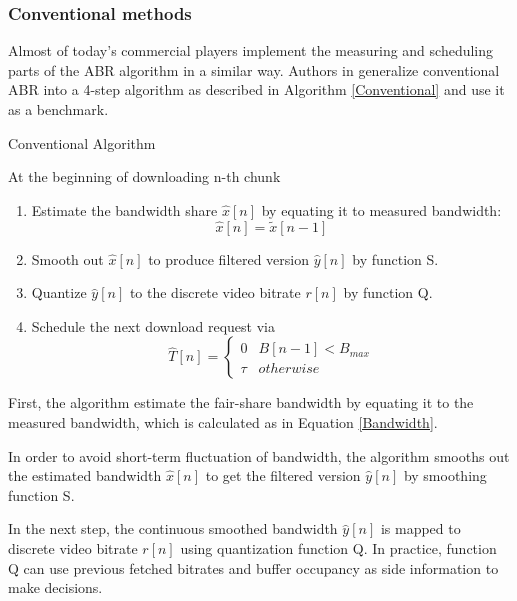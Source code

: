 \documentclass[journal]{IEEEtran}
\begin{document}
\subsubsection{Conventional methods}
Almost of today's commercial players \cite{Commercial 1} \cite{Commercial 2} \cite{Commercial 3} implement the measuring and scheduling parts of the ABR algorithm in a similar way. Authors in \cite{PANDA} generalize conventional ABR into a 4-step algorithm as described in Algorithm \ref{Conventional} and use it as a benchmark.
\begin{algorithm}
	
	\SetAlgoLined
	\caption{Conventional Algorithm}
	\label{Conventional}
		
	At the beginning of downloading n-th chunk\
    \begin{enumerate}
    	\item Estimate the bandwidth share $\hat{x}[n]$ by equating it to measured bandwidth:\
    	\begin{equation}
\hat{x}[n]=\tilde{x}[n-1]
    	\end{equation}
    	\item
    	Smooth out $\hat{x}[n]$ to produce filtered version $\hat{y}[n]$ by function S.
    	\item Quantize  $\hat{y}[n]$ to the discrete video bitrate $r[n]$ by function Q.
    	\item Schedule the next download request via
    	\begin{equation}
    	\hat{T}[n]=\begin{cases}
0 & B[n-1]<B_{max}\\
\tau & otherwise
\end{cases}
    	\end{equation}
    \end{enumerate}

		
\end{algorithm}
\par
First, the algorithm estimate the fair-share bandwidth by equating it to the measured bandwidth, which is calculated as in Equation \ref{Bandwidth}. 
\par In order to avoid short-term fluctuation of bandwidth, the algorithm smooths out the estimated bandwidth $\hat{x}[n]$ to get the filtered version $\hat{y}[n]$ by smoothing function S. 
\par In the next step, the continuous smoothed bandwidth $\hat{y}[n]$ is mapped to discrete video bitrate $r[n]$ using quantization function Q. In practice, function Q can use previous fetched bitrates and buffer occupancy as side information to make decisions.
\end{document}
